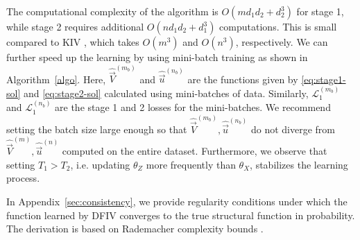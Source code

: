 
The computational complexity of the algorithm is $O(md_1d_2 + d_2^3)$ for stage 1, while stage 2 requires additional $O(nd_1d_2 + d_1^3)$ computations. This is small compared to KIV \citep{Singh2019}, which takes $O(m^3)$ and $O(n^3)$, respectively. We can further speed up the learning by using mini-batch training as shown in Algorithm~\ref{algo}. Here, $\hat{\vec{V}}^{(m_b)}$ and $\hat{\vec{u}}^{(n_b)}$ are the functions given by \eqref{eq:stage1-sol} and \eqref{eq:stage2-sol} calculated using mini-batches of data. Similarly, $\mathcal{L}_1^{(m_b)}$ and $\mathcal{L}_1^{(n_b)}$ are the stage 1 and 2 losses for the mini-batches. We recommend setting the batch size large enough so that $\hat{\vec{V}}^{(m_b)}, \hat{\vec{u}}^{(n_b)}$ do not diverge from $\hat{\vec{V}}^{(m)}, \hat{\vec{u}}^{(n)}$ computed on the entire dataset. Furthermore, we observe that setting $T_1 > T_2$, i.e. updating $\theta_Z$ more frequently than $\theta_X$, stabilizes the learning process.



In Appendix~\ref{sec:consistency}, we provide regularity conditions under which the function learned by DFIV converges to the true structural function in probability. The derivation is based on Rademacher complexity bounds \citep{FoundationOfML}.%